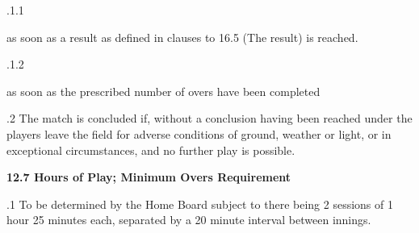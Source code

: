 \documentclass[12pt]{article}
\begin{document}
\vspace{\baselineskip}
\begin{adjustwidth}{0.49in}{0.0in}
{\fontsize{9pt}{10.8pt}.1.1 \tabto{1.17in} {\fontsize{8pt}{9.6pt}\selectfont as soon as a result as defined in clauses to 16.5 (The result) is reached.\par}\par}\par

\end{adjustwidth}


\vspace{\baselineskip}
\begin{adjustwidth}{0.49in}{0.0in}
{\fontsize{9pt}{10.8pt}.1.2 \tabto{1.17in} {\fontsize{8pt}{9.6pt}\selectfont as soon as the prescribed number of overs have been completed\par}\par}\par

\end{adjustwidth}


\vspace{\baselineskip}
\begin{adjustwidth}{0.5in}{0.11in}
{\fontsize{9pt}{10.8pt}.2 \tabto{0.49in} The match is concluded if, without a conclusion having been reached under the players leave the field for adverse conditions of ground, weather or light, or in exceptional circumstances, and no further play is possible.\par}\par

\end{adjustwidth}


\vspace{\baselineskip}
{\fontsize{11pt}{13.2pt}\selectfont \textbf{12.7 \tabto{0.47in} Hours of Play; Minimum Overs Requirement}\par}\par


\vspace{\baselineskip}
\begin{adjustwidth}{0.5in}{0.53in}
{\fontsize{9pt}{10.8pt}.1 \tabto{0.49in} To be determined by the Home Board subject to there being 2 sessions of 1 hour 25 minutes each, separated by a 20 minute interval between innings.\par}\par

\end{adjustwidth}
\end{document}
